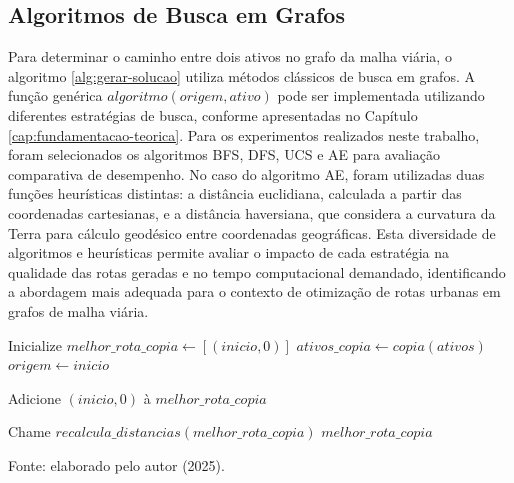 \subsection{Algoritmos de Busca em Grafos}

Para determinar o caminho entre dois ativos no grafo da malha viária, o algoritmo \ref{alg:gerar-solucao} utiliza 
métodos clássicos de busca em grafos. A função genérica $algoritmo(origem, ativo)$ pode ser 
implementada utilizando diferentes estratégias de busca, conforme apresentadas no Capítulo 
\ref{cap:fundamentacao-teorica}. Para os experimentos realizados neste trabalho, foram 
selecionados os algoritmos \gls{BFS}, \gls{DFS}, \gls{UCS} e \gls{AE} para avaliação comparativa 
de desempenho. No caso do algoritmo \gls{AE}, foram utilizadas duas funções heurísticas distintas: 
a distância euclidiana, calculada a partir das coordenadas cartesianas, e a distância haversiana, 
que considera a curvatura da Terra para cálculo geodésico entre coordenadas geográficas. Esta 
diversidade de algoritmos e heurísticas permite avaliar o impacto de cada estratégia na qualidade 
das rotas geradas e no tempo computacional demandado, identificando a abordagem mais adequada 
para o contexto de otimização de rotas urbanas em grafos de malha viária.

\begin{algorithm}[H]
\caption{Gerar Solução}
\label{alg:gerar-solucao}

Inicialize $melhor\_rota\_copia \gets [(inicio, 0)]$\;
$ativos\_copia \gets copia(ativos)$\;
$origem \gets inicio$\;


Adicione $(inicio, 0)$ à $melhor\_rota\_copia$\;

Chame $recalcula\_distancias(melhor\_rota\_copia)$\;
\Return $melhor\_rota\_copia$\;

\end{algorithm}
\begin{flushleft}
\small{Fonte: elaborado pelo autor (2025).}
\end{flushleft}

